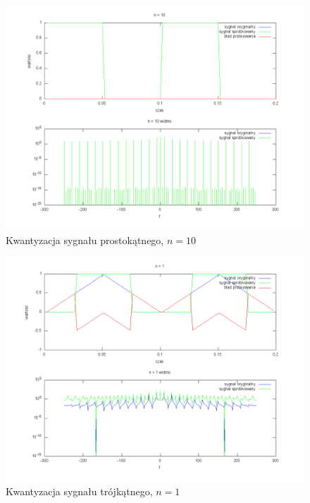 \documentclass[wide,a4paper,titlepage,12pt]{mwart}
\begin{document}
	\begin{landscape}
	  \begin{figure}[htbp]
	    \begin{center}
	      \includegraphics[scale=.5]{out/kwant2-10.png}
	      \caption{\label{kwant2-10} Kwantyzacja sygnału prostokątnego, $n=10$}
	    \end{center}
	  \end{figure}
	\end{landscape}


	\begin{landscape}
	  \begin{figure}[htbp]
	    \begin{center}
	      \includegraphics[scale=.5]{out/kwant3-1.png}
	      \caption{\label{kwant3-1} Kwantyzacja sygnału trójkątnego, $n=1$}
	    \end{center}
	  \end{figure}
	\end{landscape}
\end{document}

